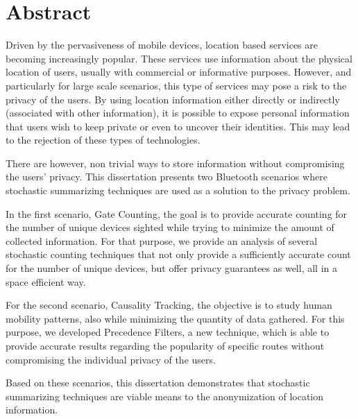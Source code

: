 \chapter*{Abstract}

Driven by the pervasiveness of mobile devices, location based services
are becoming increasingly popular. These services use
information about the physical location of users, usually with
commercial or informative purposes.  However, and particularly for
large scale scenarios, this type of services may pose a risk to the
privacy of the users. By using location information either
directly or indirectly (associated with other information), it is
possible to expose personal information that users wish to
keep private or even to uncover their identities. This may lead to
the rejection of these types of technologies.

There are however, non trivial ways to store information without
compromising the users' privacy.  This dissertation presents two
Bluetooth scenarios where stochastic summarizing techniques are used
as a solution to the privacy problem.

In the first scenario, Gate Counting, the goal is to provide accurate
counting for the number of unique devices sighted while trying to
minimize the amount of collected information. For that purpose,
we provide an analysis of several stochastic counting techniques that
not only provide a sufficiently accurate count for the number of unique devices,
but offer privacy guarantees as well, all in a space efficient way.

For the second scenario, Causality Tracking, the objective is to study
human mobility patterns, also while minimizing the quantity of data
gathered.  For this purpose, we developed Precedence Filters, a new
technique, which is able to provide accurate results regarding the
popularity of specific routes without compromising the individual
privacy of the users.

Based on these scenarios, this dissertation demonstrates that
stochastic summarizing techniques are viable means to the
anonymization of location information.


